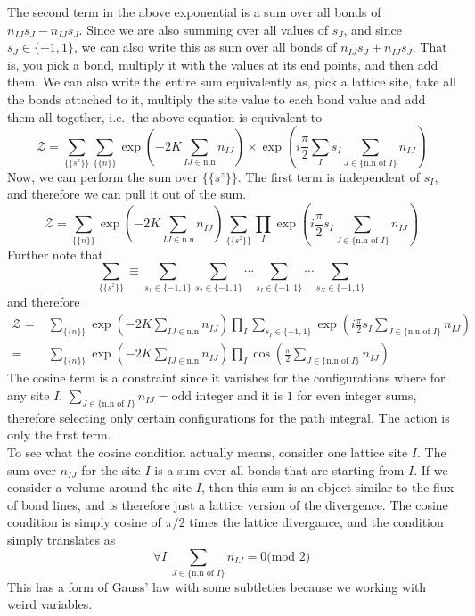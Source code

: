 \documentclass[11pt]{article}
\numberwithin{equation}{section}
\begin{document}
The second term in the above exponential is a sum over all bonds of \(n_{IJ}s_J - n_{IJ}s_J\). Since we are also summing over all values of \(s_J\), and since \(s_J\in \{-1, 1\}\), we can also write this as sum over all bonds of \(n_{IJ}s_J + n_{IJ}s_J\). That is, you pick a bond, multiply it with the values at its end points, and then add them. We can also write the entire sum equivalently as, pick a lattice site, take all the bonds attached to it, multiply the site value to each bond value and add them all together, i.e.\ the above equation is equivalent to 
\begin{equation*}
    \mathcal{Z}= \sum_{\{\{s^z\}\}} \sum_{\{\{n\}\}}  \exp\left(-2K\sum_{IJ\in \text{n.n}}n_{IJ}\right) \times \exp\left(i\frac{\pi}{2} \sum_I s_I \sum_{J\in \{\text{n.n of } I\}} n_{IJ}\right)
\end{equation*} 
Now, we can perform the sum over \(\{\{s^z\}\}\). The first term is independent of \(s_I\), and therefore we can pull it out of the sum. 
\begin{equation*}
    \mathcal{Z}=\sum_{\{\{n\}\}}  \exp\left(-2K\sum_{IJ\in \text{n.n}}n_{IJ}\right)  \sum_{\{\{s^z\}\}} \prod_I \exp\left(i\frac{\pi}{2} s_I \sum_{J\in \{\text{n.n of } I\}} n_{IJ}\right)
\end{equation*}
Further note that 
\begin{equation*}
    \sum_{\{\{s^z\}\}} \equiv \sum_{s_1 \in \{-1, 1\}} \sum_{s_2 \in \{-1, 1\}} \cdots \sum_{s_I \in \{-1, 1\}}\cdots\sum_{s_N \in \{-1, 1\}} 
\end{equation*}
and therefore 
\begin{align*}
    \mathcal{Z}=&\sum_{\{\{n\}\}}  \exp\left(-2K\sum_{IJ\in \text{n.n}}n_{IJ}\right)  \prod_I \sum_{s_I \in \{-1, 1\}} \exp\left(i\frac{\pi}{2} s_I \sum_{J\in \{\text{n.n of } I\}} n_{IJ}\right)\\
    =& \sum_{\{\{n\}\}}  \exp\left(-2K\sum_{IJ\in \text{n.n}}n_{IJ}\right)  \prod_I \cos\left(\frac{\pi}{2}\sum_{J\in \{\text{n.n of } I\}} n_{IJ}\right)
\end{align*}
The cosine term is a constraint since it vanishes for the configurations where for any site \(I\), \(\sum_{J\in \{\text{n.n of } I\}} n_{IJ} = \text{odd integer}\) and it is \(1\) for even integer sums, therefore selecting only certain configurations for the path integral. The action is only the first term.\\

To see what the cosine condition actually means, consider one lattice site \(I\). The sum over \(n_{IJ}\) for the site \(I\) is a sum over all bonds that are starting from \(I\). If we consider a volume around the site \(I\), then this sum is an object similar to the flux of bond lines, and is therefore just a lattice version of the divergence. The cosine condition is simply cosine of \(\pi/2\) times the lattice divergance, and the condition simply translates as 
\begin{equation*}
    \forall I~\sum_{J\in \{\text{n.n of } I\}} n_{IJ} = 0 \text{(mod \(2\))}
\end{equation*}
This has a form of Gauss' law with some subtleties because we working with weird variables. \\
\end{document}

